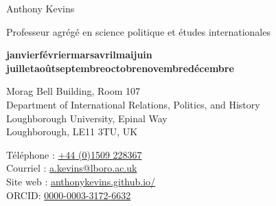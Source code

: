 \documentclass[letterpaper,fontsize=10.5pt]{scrartcl}
\newcommand{\moisannee}{%
  \ifcase\month\or janvier\or février\or mars\or avril\or mai\or juin\or
  juillet\or août\or septembre\or octobre\or novembre\or décembre\fi
  \space\number\year
}
\begin{document}
\pagestyle{plain}



\huge Anthony Kevins\\
\begin{minipage}[t]{.87\linewidth}
	\large Professeur agrégé en science politique et études internationales\\
\end{minipage}%
\begin{minipage}[t]{.13\linewidth}
	\raggedleft
	\scriptsize \textbf{\moisannee}\\
\end{minipage}%
\normalsize

\hrulefill

\begin{minipage}[p]{.6\linewidth}
	\raggedright
	\medskip
	Morag Bell Building, Room 107\\
	Department of International Relations, Politics, and History\\
	Loughborough University, Epinal Way\\
	Loughborough, LE11 3TU, UK\\
	\medskip
\end{minipage}%
\begin{minipage}[p]{.4\linewidth}
	\raggedleft
	\medskip
	Téléphone : \href{tel:+4401509228367}{+44 (0)1509 228367}\\
	Courriel : \href{mailto:a.kevins@lboro.ac.uk}{a.kevins@lboro.ac.uk}\\
	Site web : \href{https://anthonykevins.github.io/fr/}{anthonykevins.github.io/}\\
	ORCID: \href{https://orcid.org/0000-0003-3172-6632}{0000-0003-3172-6632}\\
	\medskip
\end{minipage}%

\hrulefill

\end{document}

